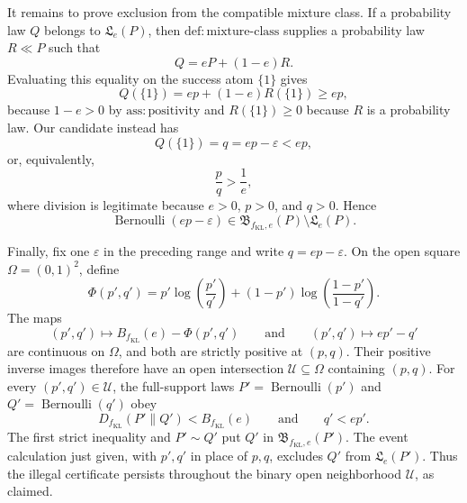 It remains to prove exclusion from the compatible mixture class. If a probability law \(Q\) belongs to \(\mathfrak L_e(P)\), then \(\mathrm{def{:}mixture\text{-}class}\) supplies a probability law \(R\ll P\) such that
\[
Q=eP+(1-e)R.
\]
Evaluating this equality on the success atom \(\{1\}\) gives
\[
Q(\{1\})=ep+(1-e)R(\{1\})\ge ep,
\]
because \(1-e>0\) by \(\mathrm{ass{:}positivity}\) and \(R(\{1\})\ge0\) because \(R\) is a probability law. Our candidate instead has
\[
Q(\{1\})=q=ep-\varepsilon<ep,
\]
or, equivalently,
\[
\frac{p}{q}>\frac{1}{e},
\]
where division is legitimate because \(e>0\), \(p>0\), and \(q>0\). Hence
\[
\operatorname{Bernoulli}(ep-\varepsilon)
\in\mathfrak B_{f_{\mathrm{KL}},e}(P)
\setminus\mathfrak L_e(P).
\]

Finally, fix one \(\varepsilon\) in the preceding range and write \(q=ep-\varepsilon\). On the open square \(\Omega=(0,1)^2\), define
\[
\Phi(p',q')=p'\log\!\left(\frac{p'}{q'}\right)
+(1-p')\log\!\left(\frac{1-p'}{1-q'}\right).
\]
The maps
\[
(p',q')\longmapsto B_{f_{\mathrm{KL}}}(e)-\Phi(p',q')
\qquad\text{and}\qquad
(p',q')\longmapsto ep'-q'
\]
are continuous on \(\Omega\), and both are strictly positive at \((p,q)\). Their positive inverse images therefore have an open intersection \(\mathcal U\subseteq\Omega\) containing \((p,q)\). For every \((p',q')\in\mathcal U\), the full-support laws \(P'=\operatorname{Bernoulli}(p')\) and \(Q'=\operatorname{Bernoulli}(q')\) obey
\[
D_{f_{\mathrm{KL}}}(P'\|Q')<B_{f_{\mathrm{KL}}}(e)
\qquad\text{and}\qquad
q'<ep'.
\]
The first strict inequality and \(P'\sim Q'\) put \(Q'\) in \(\mathfrak B_{f_{\mathrm{KL}},e}(P')\). The event calculation just given, with \(p',q'\) in place of \(p,q\), excludes \(Q'\) from \(\mathfrak L_e(P')\). Thus the illegal certificate persists throughout the binary open neighborhood \(\mathcal U\), as claimed.
